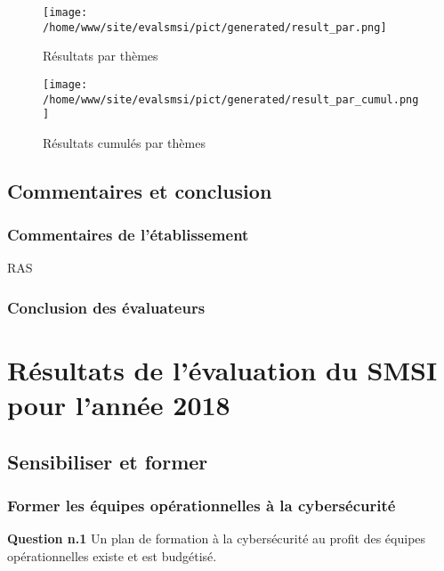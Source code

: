 \begin{figure}[ht]
\begin{center}\texttt{[image: /home/www/site/evalsmsi/pict/generated/result\_par.png]}\end{center}
\caption{Résultats par thèmes}
\end{figure}

\begin{figure}[ht]
\begin{center}\texttt{[image: /home/www/site/evalsmsi/pict/generated/result\_par\_cumul.png]}\end{center}
\caption{Résultats cumulés par thèmes}
\end{figure}

\subsection{Commentaires et conclusion}

\subsubsection{Commentaires de l'établissement}

\par
RAS
\par\subsubsection{Conclusion des évaluateurs}

\par

\par\clearpage


\section{Résultats de l'évaluation du SMSI pour l'année 2018}

\subsection{Sensibiliser et former}

\subsubsection{Former les équipes opérationnelles à la cybersécurité}

\textbf{Question n.1} Un plan de formation à la cybersécurité au profit des équipes opérationnelles  existe et est budgétisé.

